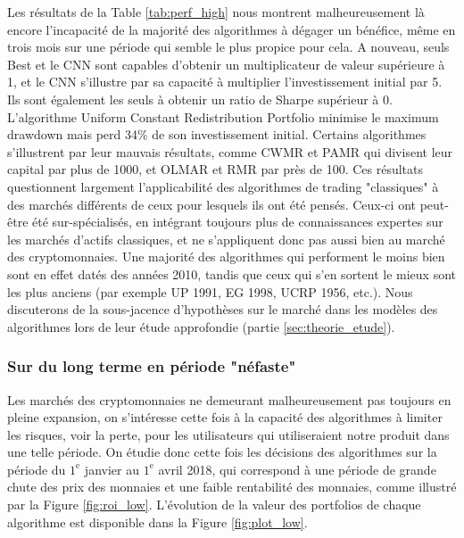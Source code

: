 \documentclass[a4paper, 10pt]{article}
\begin{document}
Les résultats de la Table \ref{tab:perf_high} nous montrent malheureusement là encore l'incapacité de la majorité des algorithmes à dégager un bénéfice, même en trois mois   sur une période qui semble le plus propice pour cela. A nouveau, seuls Best et le CNN sont capables d'obtenir un multiplicateur de valeur supérieure à 1, et le CNN s'illustre par sa capacité à multiplier l'investissement initial par 5. Ils sont également les seuls à obtenir un ratio de Sharpe supérieur à 0. L'algorithme Uniform Constant Redistribution Portfolio minimise le maximum drawdown mais perd 34\% de son investissement initial. Certains algorithmes s'illustrent par leur mauvais résultats, comme CWMR et PAMR qui divisent leur capital par plus de 1000, et OLMAR et RMR par près de 100. Ces résultats questionnent largement l'applicabilité des algorithmes de trading "classiques" à des marchés différents de ceux pour lesquels ils ont été pensés. Ceux-ci ont peut-être été sur-spécialisés, en intégrant toujours plus de connaissances expertes sur les marchés d’actifs classiques, et ne s’appliquent donc pas aussi bien au marché des cryptomonnaies. Une majorité des algorithmes qui performent le moins bien sont en effet datés des années 2010, tandis que ceux qui s'en sortent le mieux sont les plus anciens (par exemple UP 1991, EG 1998, UCRP 1956, etc.). Nous discuterons de la sous-jacence d'hypothèses sur le marché dans les modèles des algorithmes lors de leur étude approfondie (partie \ref{sec:theorie_etude}).

\subsubsection{Sur du long terme en période "néfaste"}
\label{sec:theorie_empirique_nefaste}

Les marchés des cryptomonnaies ne demeurant malheureusement pas toujours en pleine expansion, on s'intéresse cette fois à la capacité des algorithmes à limiter les risques, voir la perte, pour les utilisateurs qui utiliseraient notre produit dans une telle période. On étudie donc cette fois les décisions des algorithmes sur la période du $1^{\text{e}}$ janvier au $1^{\text{e}}$ avril 2018, qui correspond à une période de grande chute des prix des monnaies et une faible rentabilité des monnaies, comme illustré par la Figure \ref{fig:roi_low}. L'évolution de la valeur des portfolios de chaque algorithme est disponible dans la Figure \ref{fig:plot_low}.
\end{document}
